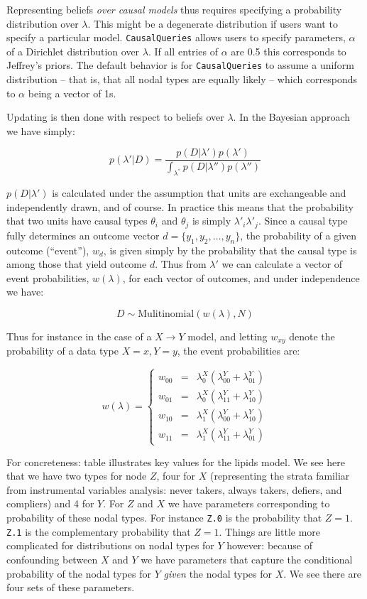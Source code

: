 \documentclass[
  11pt,
  article]{jss}
\begin{document}
Representing beliefs \emph{over causal models} thus requires specifying
a probability distribution over \(\lambda\). This might be a degenerate
distribution if users want to specify a particular model.
\texttt{CausalQueries} allows users to specify parameters, \(\alpha\) of
a Dirichlet distribution over \(\lambda\). If all entries of \(\alpha\)
are 0.5 this corresponds to Jeffrey's priors. The default behavior is
for \texttt{CausalQueries} to assume a uniform distribution -- that is,
that all nodal types are equally likely -- which corresponds to
\(\alpha\) being a vector of 1s.

Updating is then done with respect to beliefs over \(\lambda\). In the
Bayesian approach we have simply:

\[p(\lambda'|D) = \frac{p(D|\lambda')p(\lambda')}{\int_{\lambda^{''}} p(D|\lambda'')p(\lambda'')}\]

\(p(D|\lambda')\) is calculated under the assumption that units are
exchangeable and independently drawn, and of course. In practice this
means that the probability that two units have causal types \(\theta_i\)
and \(\theta_j\) is simply \(\lambda'_i\lambda'_j\). Since a causal type
fully determines an outcome vector \(d = \{y_1, y_2,\dots,y_n\}\), the
probability of a given outcome (``event''), \(w_d\), is given simply by
the probability that the causal type is among those that yield outcome
\(d\). Thus from \(\lambda'\) we can calculate a vector of event
probabilities, \(w(\lambda)\), for each vector of outcomes, and under
independence we have:

\[D \sim \text{Mulitinomial}(w(\lambda), N)\]

Thus for instance in the case of a \(X \rightarrow Y\) model, and
letting \(w_{xy}\) denote the probability of a data type \(X=x, Y=y\),
the event probabilities are:

\[w(\lambda) = \left\{\begin{array}{ccc} w_{00} & = & \lambda^X_0(\lambda^Y_{00} + \lambda^Y_{01})\\ 
w_{01} & = & \lambda^X_0(\lambda^Y_{11} + \lambda^Y_{10})\\
w_{10} & = & \lambda^X_1(\lambda^Y_{00} + \lambda^Y_{10})\\
w_{11} & = & \lambda^X_1(\lambda^Y_{11} + \lambda^Y_{01})\end{array} \right.\]

For concreteness: table \citet{lipidspar} illustrates key values for the
lipids model. We see here that we have two types for node \(Z\), four
for \(X\) (representing the strata familiar from instrumental variables
analysis: never takers, always takers, defiers, and compliers) and 4 for
\(Y\). For \(Z\) and \(X\) we have parameters corresponding to
probability of these nodal types. For instance \texttt{Z.0} is the
probability that \(Z=1\). \texttt{Z.1} is the complementary probability
that \(Z=1\). Things are little more complicated for distributions on
nodal types for \(Y\) however: because of confounding between \(X\) and
\(Y\) we have parameters that capture the conditional probability of the
nodal types for \(Y\) \emph{given} the nodal types for \(X\). We see
there are four sets of these parameters.
\end{document}

